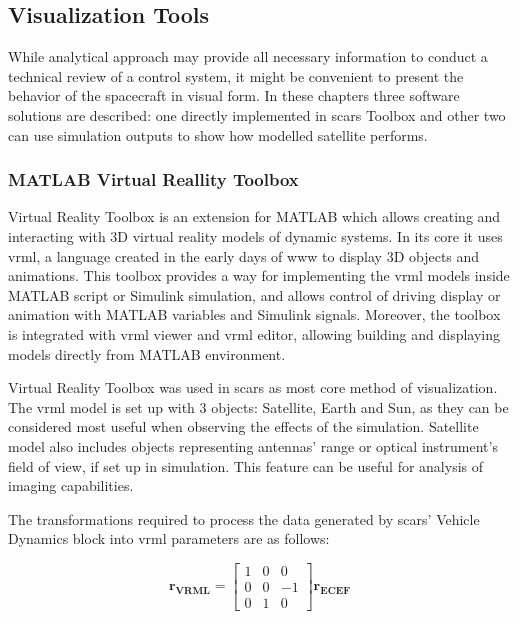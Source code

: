 \clearpage
\subsection{Visualization Tools}\label{sec:visualization}
    While analytical approach may provide all necessary information to conduct a technical review of a control system, it might be convenient to present the behavior of the spacecraft in visual form. In these chapters three software solutions are described: one directly implemented in \ac{scars} Toolbox and other two can use simulation outputs to show how modelled satellite performs.
    
    \subsubsection{MATLAB Virtual Reallity Toolbox}
        Virtual Reality Toolbox is an extension for MATLAB which allows creating and interacting with 3D virtual reality models of dynamic systems. In its core it uses \ac{vrml}, a language created in the early days of \ac{www} to display 3D objects and animations. This toolbox provides a way for implementing the \ac{vrml} models inside MATLAB script or Simulink simulation, and allows control of driving display or animation with MATLAB variables and Simulink signals. Moreover, the toolbox is integrated with \ac{vrml} viewer and \ac{vrml} editor, allowing building and displaying models directly from MATLAB environment.

        Virtual Reality Toolbox was used in \ac{scars} as most core method of visualization. The \ac{vrml} model is set up with 3 objects: Satellite, Earth and Sun, as they can be considered most useful when observing the effects of the simulation. Satellite model also includes objects representing antennas' range or optical instrument's field of view, if set up in simulation. This feature can be useful for analysis of imaging capabilities.

        The transformations required to process the data generated by \ac{scars}' Vehicle Dynamics block into \ac{vrml} parameters are as follows:
        
        \begin{equation}
            \mathbf{r_{VRML}}=
            \begin{bmatrix}
            1&0&0\\ 
            0&0&-1\\ 
            0&1&0
            \end{bmatrix}
            \mathbf{r_{ECEF}}
        \end{equation}
        
